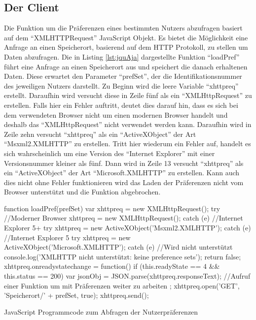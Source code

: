 \documentclass[12pt, paper=a4, bibtotoc, toc=listof, headsepline=true, numbers=endperiod]{scrreprt}
\begin{document}
\subsection{Der Client}
Die Funktion um die Präferenzen eines bestimmten Nutzers abzufragen basiert auf dem \enquote{XMLHTTPRequest} JavaScript Objekt. Es bietet die Möglichkeit eine Anfrage an einen Speicherort, basierend auf dem \ac{HTTP} Protokoll, zu stellen um Daten abzufragen.
Die in Listing \ref{lst:jquAja} dargestellte Funktion \enquote{loadPref} führt eine Anfrage an einen Speicherort aus und speichert die danach erhaltenen Daten. Diese erwartet den Parameter \enquote{prefSet}, der die Identifikationsnummer des jeweiligen Nutzers darstellt. Zu Beginn wird die leere Variable \enquote{xhttpreq} erstellt. Daraufhin wird versucht diese in Zeile fünf als ein \enquote{XMLHttpRequest} zu erstellen. Falls hier ein Fehler auftritt, deutet dies darauf hin, dass es sich bei dem verwendeten Browser nicht um einen modernen Browser handelt und deshalb das \enquote{XMLHttpRequest} nicht verwendet werden kann. Daraufhin wird in Zeile zehn versucht \enquote{xhttpreq} als ein \enquote{ActiveXObject} der Art \enquote{Msxml2.XMLHTTP} zu erstellen. Tritt hier wiederum ein Fehler auf, handelt es sich wahrscheinlich um eine Version des \enquote{Internet Explorer} mit einer Versionsnummer kleiner als fünf. Dann wird in Zeile 13 versucht \enquote{xhttpreq} als ein \enquote{ActiveXObject} der Art \enquote{Microsoft.XMLHTTP} zu erstellen. Kann auch dies nicht ohne Fehler funktionieren wird das Laden der Präferenzen nicht vom Browser unterstützt und die Funktion abgebrochen.
\begin{listing}[H]
	\begin{JavaScriptcode*}{}
function loadPref(prefSet) {
	var xhttpreq = new XMLHttpRequest();
	try{
		//Moderner Browser
		xhttpreq = new XMLHttpRequest();
	}catch (e){
		//Internet Explorer 5+
		try{
			xhttpreq = new ActiveXObject('Msxml2.XMLHTTP');
		}catch (e) {
			//Internet Explorer 5
			try{
				xhttpreq = new ActiveXObject('Microsoft.XMLHTTP');
			}catch (e){
				//Wird nicht unterstützt
				console.log('XMLHTTP nicht unterstützt: keine preference sets');
				return false;
			}
		}
	}
	xhttpreq.onreadystatechange = function() {
		if (this.readyState == 4 && this.status == 200) {
			var jsonObj = JSON.parse(xhttpreq.responseText);
			//Aufruf einer Funktion um mit Präferenzen weiter zu arbeiten
		}
	};
	xhttpreq.open('GET', 'Speicherort/' + prefSet, true);
	xhttpreq.send(); 	
}
	\end{JavaScriptcode*}
	\caption[Abfragen der Nutzerpräferenzen]{JavaScript Programmcode zum Abfragen der Nutzerpräferenzen}
	\label{lst:jquAja}
\end{listing}\noindent
\end{document}
